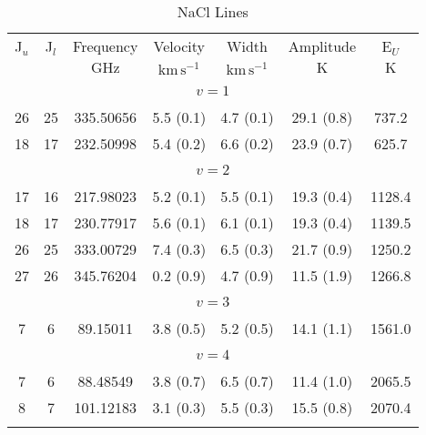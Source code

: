 \begin{table*}[htp]
\centering
\caption{NaCl Lines}
\begin{tabular}{ccccccc}
\label{tab:NaCl_salt_lines}
 J$_u$ & J$_l$ & Frequency & Velocity & Width & Amplitude & E$_U$ \\
  &  & $\mathrm{GHz}$ & $\mathrm{km\,s^{-1}}$ & $\mathrm{km\,s^{-1}}$ & $\mathrm{K}$ & $\mathrm{K}$ \\
\hline
&\vspace{-0.75em}\\
\multicolumn{7}{c}{$v = 1$} \\
\vspace{-0.75em}\\
 26 & 25 & 335.50656 & 5.5 (0.1) & 4.7 (0.1) & 29.1 (0.8) & 737.2 \\
 18 & 17 & 232.50998 & 5.4 (0.2) & 6.6 (0.2) & 23.9 (0.7) & 625.7 \\
&\vspace{-0.75em}\\
\multicolumn{7}{c}{$v = 2$} \\
\vspace{-0.75em}\\
 17 & 16 & 217.98023 & 5.2 (0.1) & 5.5 (0.1) & 19.3 (0.4) & 1128.4 \\
 18 & 17 & 230.77917 & 5.6 (0.1) & 6.1 (0.1) & 19.3 (0.4) & 1139.5 \\
 26 & 25 & 333.00729 & 7.4 (0.3) & 6.5 (0.3) & 21.7 (0.9) & 1250.2 \\
 27 & 26 & 345.76204 & 0.2 (0.9) & 4.7 (0.9) & 11.5 (1.9) & 1266.8 \\
&\vspace{-0.75em}\\
\multicolumn{7}{c}{$v = 3$} \\
\vspace{-0.75em}\\
 7 & 6 & 89.15011 & 3.8 (0.5) & 5.2 (0.5) & 14.1 (1.1) & 1561.0 \\
&\vspace{-0.75em}\\
\multicolumn{7}{c}{$v = 4$} \\
\vspace{-0.75em}\\
 7 & 6 & 88.48549 & 3.8 (0.7) & 6.5 (0.7) & 11.4 (1.0) & 2065.5 \\
 8 & 7 & 101.12183 & 3.1 (0.3) & 5.5 (0.3) & 15.5 (0.8) & 2070.4 \\
&\vspace{-0.75em}\\

\end{tabular}
\end{table*}
